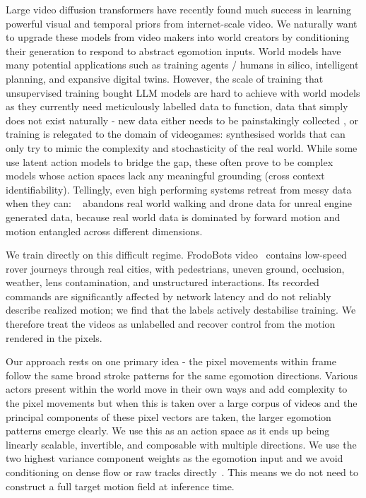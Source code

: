 \documentclass[letterpaper]{article} %
\begin{document}
Large video diffusion transformers have recently found much success in learning powerful visual and temporal priors from internet-scale video. We naturally want to upgrade these models from video makers into world creators by conditioning their generation to respond to abstract egomotion inputs. World models have many potential applications such as training agents / humans in silico, intelligent planning, and expansive digital twins. However, the scale of training that unsupervised training bought LLM models are hard to achieve with world models as they currently need meticulously labelled data to function, data that simply does not exist naturally - new data either needs to be painstakingly collected \cite{navwormod, cameracontrol2, cosmos2, uniwm, xworld, gaia2}, or training is relegated to the domain of videogames: \cite{gamengen2024, diamond, olafworld, mineworld, gamefactory, oasis2} synthesised worlds that can only try to mimic the complexity and stochasticity of the real world. While some \cite{genie, gamengen2024, olafworld, adaworld} use latent action models to bridge the gap, these often prove to be complex models whose action spaces lack any meaningful grounding (cross context identifiability). Tellingly, even high performing systems retreat from messy data when they can: ~\cite{relic} abandons real world walking and drone data for unreal engine generated data, because real world data is dominated by forward motion and motion entangled across different dimensions. 

We train directly on this difficult regime. FrodoBots
video~\cite{frodobots} contains low-speed rover journeys through real cities,
with pedestrians, uneven ground, occlusion, weather, lens contamination, and
unstructured interactions. Its recorded commands are significantly affected by network latency and do not reliably describe realized motion; we find that the labels actively destabilise training. We therefore treat the videos as unlabelled and recover control from the motion rendered in the pixels.

Our approach rests on one primary idea - the pixel movements within frame follow the same broad stroke patterns for the same egomotion directions. Various actors present within the world move in their own ways and add complexity to the pixel movements but when this is taken over a large corpus of videos and the principal components of these pixel vectors are taken, the larger egomotion patterns emerge clearly. We use this as an action space as it ends up being linearly scalable, invertible, and composable with multiple directions. We use the two highest variance component weights as the egomotion input and we avoid conditioning on dense flow or raw tracks
directly~\cite{flovd,motionprompting,onlyflow}. This means we do not need to construct a full target motion
field at inference time.
\end{document}
